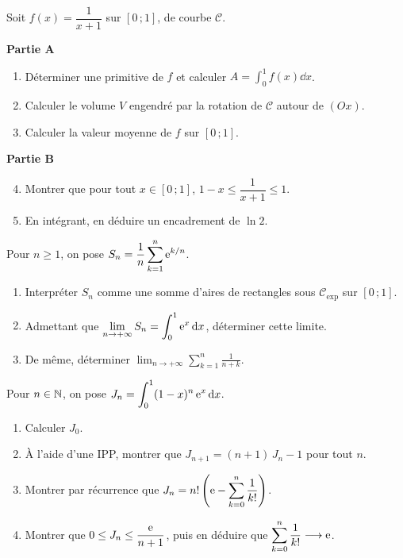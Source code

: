Soit $f(x)=\dfrac{1}{x+1}$ sur $[0\,;1]$, de courbe $\mathcal C$.

\textbf{Partie A}
\begin{enumerate}
	\item Déterminer une primitive de $f$ et calculer
	$A=\displaystyle\int_0^{1}f(x)\dd x$.
	\item Calculer le volume $V$ engendré par la rotation de $\mathcal C$ autour
	de $(Ox)$.
	\item Calculer la valeur moyenne de $f$ sur $[0\,;1]$.
\end{enumerate}

\textbf{Partie B}
\begin{enumerate}
	\setcounter{enumi}{3}
	\item Montrer que pour tout $x\in[0\,;1]$,
	$1-x\leq\dfrac{1}{x+1}\leq 1$.
	\item En intégrant, en déduire un encadrement de $\ln 2$.
\end{enumerate}

Pour $n\geq 1$, on pose
$S_n=\dfrac{1}{n}\displaystyle\sum_{k=1}^{n}\mathrm{e}^{k/n}$.
\begin{enumerate}
	\item Interpréter $S_n$ comme une somme d'aires de rectangles sous
	$\mathcal C_{\exp}$ sur $[0\,;1]$.
	\item Admettant que $\displaystyle\lim_{n\to+\infty}S_n=\int_0^{1}\mathrm{e}^{x}\,\mathrm{d} x$,
	déterminer cette limite.
	\item De même, déterminer $\displaystyle\lim_{n\to+\infty}
	\sum_{k=1}^{n}\frac{1}{n+k}$.
\end{enumerate}

Pour $n\in\mathbb{N}$, on pose $J_n=\displaystyle\int_0^{1}(1-x)^{n}\,\mathrm{e}^{x}\,\mathrm{d} x$.
\begin{enumerate}
	\item Calculer $J_0$.
	\item À l'aide d'une IPP, montrer que $J_{n+1}=(n+1)\,J_n-1$ pour tout
	$n$.
	\item Montrer par récurrence que
	$J_n=n!\left(\mathrm{e}-\displaystyle\sum_{k=0}^{n}\frac{1}{k!}\right)$.
	\item Montrer que $0\leq J_n\leq\dfrac{\mathrm{e}}{n+1}$, puis en déduire que
	$\displaystyle\sum_{k=0}^{n}\frac{1}{k!}\longrightarrow\mathrm{e}$.
\end{enumerate}
